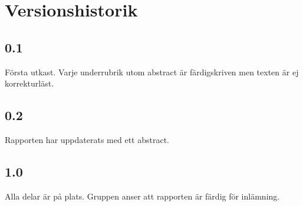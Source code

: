 \section*{Versionshistorik}
\subsection*{0.1}
Första utkast. Varje underrubrik utom abstract är färdigskriven men texten är ej korrekturläst.

\subsection*{0.2}
Rapporten har uppdaterats med ett abstract.

\subsection*{1.0}
Alla delar är på plats. Gruppen anser att rapporten är färdig för inlämning.
